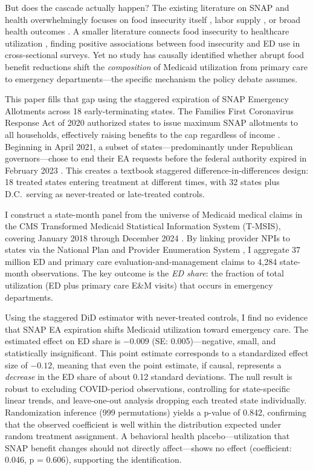 \documentclass[12pt]{article}
\begin{document}
But does the cascade actually happen? The existing literature on SNAP and health overwhelmingly focuses on food insecurity itself \citep{gundersen2015snap, east2024snap}, labor supply \citep{hoynes2012snap}, or broad health outcomes \citep{almond2011inside}. A smaller literature connects food insecurity to healthcare utilization \citep{tarasuk2015food, berkowitz2018food}, finding positive associations between food insecurity and ED use in cross-sectional surveys. Yet no study has causally identified whether abrupt food benefit reductions shift the \textit{composition} of Medicaid utilization from primary care to emergency departments---the specific mechanism the policy debate assumes.

This paper fills that gap using the staggered expiration of SNAP Emergency Allotments across 18 early-terminating states. The Families First Coronavirus Response Act of 2020 authorized states to issue maximum SNAP allotments to all households, effectively raising benefits to the cap regardless of income \citep{usda2020ffcra}. Beginning in April 2021, a subset of states---predominantly under Republican governors---chose to end their EA requests before the federal authority expired in February 2023 \citep{cbpp2023snap}. This creates a textbook staggered difference-in-differences design: 18 treated states entering treatment at different times, with 32 states plus D.C.\ serving as never-treated or late-treated controls.

I construct a state-month panel from the universe of Medicaid medical claims in the CMS Transformed Medicaid Statistical Information System (T-MSIS), covering January 2018 through December 2024 \citep{cms2024tmsis}. By linking provider NPIs to states via the National Plan and Provider Enumeration System \citep{cms_nppes}, I aggregate 37 million ED and primary care evaluation-and-management claims to 4,284 state-month observations. The key outcome is the \textit{ED share}: the fraction of total utilization (ED plus primary care E\&M visits) that occurs in emergency departments.

Using the \citet{callaway2021difference} staggered DiD estimator with never-treated controls, I find no evidence that SNAP EA expiration shifts Medicaid utilization toward emergency care. The estimated effect on ED share is $-0.009$ (SE: 0.005)---negative, small, and statistically insignificant. This point estimate corresponds to a standardized effect size of $-0.12$, meaning that even the point estimate, if causal, represents a \textit{decrease} in the ED share of about 0.12 standard deviations. The null result is robust to excluding COVID-period observations, controlling for state-specific linear trends, and leave-one-out analysis dropping each treated state individually. Randomization inference (999 permutations) yields a p-value of 0.842, confirming that the observed coefficient is well within the distribution expected under random treatment assignment. A behavioral health placebo---utilization that SNAP benefit changes should not directly affect---shows no effect (coefficient: 0.046, p = 0.606), supporting the identification.
\end{document}
